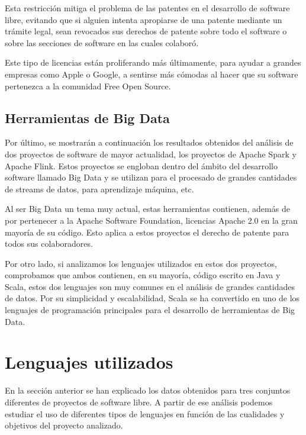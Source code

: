 \documentclass[a4paper, spanish, 12pt]{book}
\begin{document}
Esta restricci\'on mitiga el problema de las patentes en el desarrollo de software libre, evitando que si alguien
intenta apropiarse de una patente mediante un tr\'amite legal, sean revocados sus derechos de patente sobre todo
el software o sobre las secciones de software en las cuales colabor\'o.

Este tipo de licencias est\'an proliferando m\'as \'ultimamente, para ayudar a grandes empresas como Apple o Google,
a sentirse m\'as c\'omodas al hacer que su software pertenezca a la comunidad Free Open Source.

\subsection{Herramientas de Big Data}
\label{subsec: big_data}

Por \'ultimo, se mostrar\'an a continuaci\'on los resultados obtenidos del an\'alisis de dos proyectos de software de
mayor actualidad, los proyectos de Apache Spark y Apache Flink. Estos proyectos se engloban dentro del \'ambito del
desarrollo software llamado Big Data y se utilizan para el procesado de grandes cantidades de streams de datos, para
aprendizaje m\'aquina, etc.

Al ser Big Data un tema muy actual, estas herramientas contienen, adem\'as de por pertenecer a la Apache Software
Foundation, licencias Apache 2.0 en la gran mayor\'ia de su c\'odigo. Esto aplica a estos proyectos el derecho
de patente para todos sus colaboradores.

Por otro lado, si analizamos los lenguajes utilizados en estos dos proyectos, comprobamos
que ambos contienen, en su mayor\'ia, c\'odigo escrito en Java y Scala, estos dos lenguajes
son muy comunes en el an\'alisis de grandes cantidades de datos. Por su simplicidad
y escalabilidad, Scala se ha convertido en uno de los lenguajes de programaci\'on
principales para el desarrollo de herramientas de Big Data.

\section{Lenguajes utilizados}
\label{sec:languages}

En la secci\'on anterior se han explicado los datos obtenidos para tres conjuntos
diferentes de proyectos de software libre. A partir de ese an\'alisis podemos estudiar
el uso de diferentes tipos de lenguajes en funci\'on de las cualidades y objetivos del
proyecto analizado.
\end{document}

